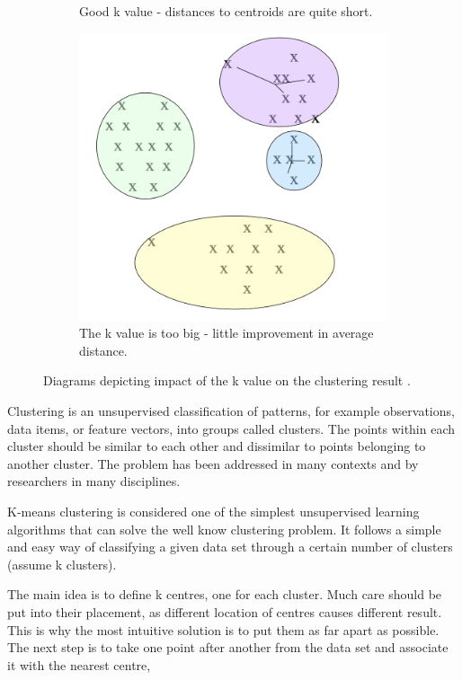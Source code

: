 \begin{figure}[b]
\begin{subfigure}[t]{0.30\textwidth}
                \caption{Good k value - distances to centroids are quite short.}
                \label{fig:justright}
        \end{subfigure}
         \begin{subfigure}[t]{0.30\textwidth}
                \includegraphics[width=\textwidth]{Figures/overfitting}
                \caption{The k value is too big - little improvement in average distance.}
                \label{fig:overfitting}
        \end{subfigure}
          \caption{Diagrams depicting impact of the k value on the clustering result \cite{kcluster}.}
        \label{fig:ssmdistance}
\end{figure}

Clustering is an unsupervised classification of patterns, for example observations, data items, or feature vectors, into groups called clusters. The points within each cluster should be similar to each other and dissimilar to points belonging to another cluster. The problem has been addressed in many contexts and by researchers in many disciplines.

K-means clustering is considered one of the simplest unsupervised learning algorithms that can solve the well know clustering problem. It follows a simple and easy way of classifying a given data set through a certain number of clusters (assume k clusters).

The main idea  is to define k centres, one for each cluster. Much care should be put into their placement, as different location of centres causes different result. This is why the most intuitive solution is to put them as far apart as possible. The next step is to take one point after another from the data set and associate it with the nearest centre, 

